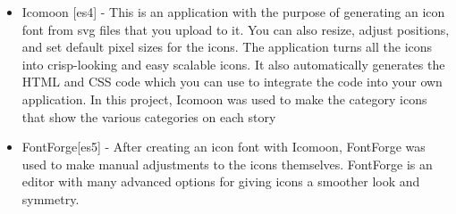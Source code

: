 \begin{itemize}
	\item Icomoon [es4] - This is an application with the purpose of generating an icon font from svg files that you upload to it. You can also resize, adjust positions, and set default pixel sizes for the icons. The application turns all the icons into crisp-looking and easy scalable icons. It also automatically generates the HTML and CSS code which you can use to integrate the code into your own application. In this project, Icomoon was used to make the category icons that show the various categories on each story
	\item FontForge[es5] - After creating an icon font with Icomoon, FontForge was used to make manual adjustments to the icons themselves. FontForge is an editor with many advanced options for giving icons a smoother look and symmetry.	
\end{itemize}

